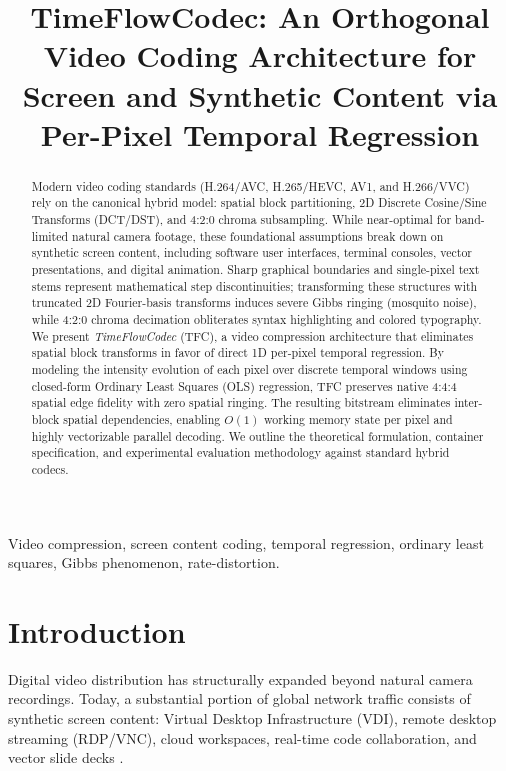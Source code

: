 \documentclass[conference]{IEEEtran}
\begin{document}
\title{TimeFlowCodec: An Orthogonal Video Coding Architecture for Screen and Synthetic Content via Per-Pixel Temporal Regression}

\author{
}

\maketitle

\begin{abstract}
Modern video coding standards (H.264/AVC, H.265/HEVC, AV1, and H.266/VVC) rely on the canonical hybrid model: spatial block partitioning, 2D Discrete Cosine/Sine Transforms (DCT/DST), and 4:2:0 chroma subsampling. While near-optimal for band-limited natural camera footage, these foundational assumptions break down on synthetic screen content, including software user interfaces, terminal consoles, vector presentations, and digital animation. Sharp graphical boundaries and single-pixel text stems represent mathematical step discontinuities; transforming these structures with truncated 2D Fourier-basis transforms induces severe Gibbs ringing (mosquito noise), while 4:2:0 chroma decimation obliterates syntax highlighting and colored typography. We present \textit{TimeFlowCodec} (TFC), a video compression architecture that eliminates spatial block transforms in favor of direct 1D per-pixel temporal regression. By modeling the intensity evolution of each pixel over discrete temporal windows using closed-form Ordinary Least Squares (OLS) regression, TFC preserves native 4:4:4 spatial edge fidelity with zero spatial ringing. The resulting bitstream eliminates inter-block spatial dependencies, enabling $O(1)$ working memory state per pixel and highly vectorizable parallel decoding. We outline the theoretical formulation, container specification, and experimental evaluation methodology against standard hybrid codecs.
\end{abstract}

\begin{IEEEkeywords}
Video compression, screen content coding, temporal regression, ordinary least squares, Gibbs phenomenon, rate-distortion.
\end{IEEEkeywords}

\section{Introduction}
Digital video distribution has structurally expanded beyond natural camera recordings. Today, a substantial portion of global network traffic consists of synthetic screen content: Virtual Desktop Infrastructure (VDI), remote desktop streaming (RDP/VNC), cloud workspaces, real-time code collaboration, and vector slide decks \cite{xu2015overview}.
\end{document}

